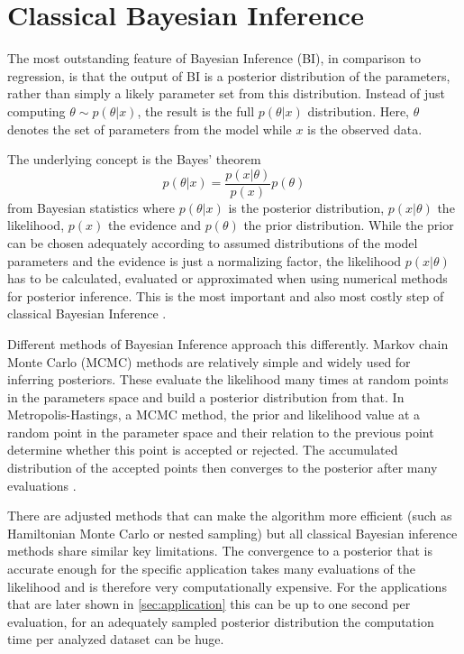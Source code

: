 \section{Classical Bayesian Inference}%
\label{sec:bayes}

The most outstanding feature of Bayesian Inference (BI), in comparison to regression, is that the output of BI is a posterior distribution of the parameters, rather than simply a likely parameter set from this distribution.
Instead of just computing $\theta \sim p(\theta|x)$, the result is the full $p(\theta|x)$ distribution.
Here, $\theta$ denotes the set of parameters from the model while $x$ is the observed data. 

The underlying concept is the Bayes' theorem 
\begin{equation}
  p(\theta|x) = \frac{p(x|\theta)}{p(x)} p(\theta)
  \label{eq:bayes}
\end{equation}
from Bayesian statistics where $p(\theta|x)$ is the posterior distribution, $p(x|\theta)$ the likelihood, $p(x)$ the evidence and $p(\theta)$ the prior distribution.
While the prior can be chosen adequately according to assumed distributions of the model parameters and the evidence is just a normalizing factor, the likelihood $p(x|\theta)$ has to be calculated, evaluated or approximated when using numerical methods for posterior inference.
This is the most important and also most costly step of classical Bayesian Inference \citep[Sec.\,1]{sbi-guide}.

Different methods of Bayesian Inference approach this differently.
Markov chain Monte Carlo (MCMC) methods are relatively simple and widely used for inferring posteriors.
These evaluate the likelihood many times at random points in the parameters space and build a posterior distribution from that.
In Metropolis-Hastings, a MCMC method, the prior and likelihood value at a random point in the parameter space and their relation to the previous point determine whether this point is accepted or rejected.
The accumulated distribution of the accepted points then converges to the posterior after many evaluations \citep{Metropolis1953,Hastings1970}.

There are adjusted methods that can make the algorithm more efficient (such as Hamiltonian Monte Carlo or nested sampling) but all classical Bayesian inference methods share similar key limitations.
The convergence to a posterior that is accurate enough for the specific application takes many evaluations of the likelihood and is therefore very computationally expensive.
For the applications that are later shown in \cref{sec:application} this can be up to one second per evaluation, for an adequately sampled posterior distribution the computation time per analyzed dataset can be huge.

